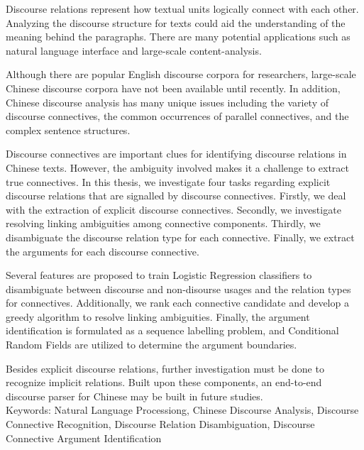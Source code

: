 \begin{abstracten}

Discourse relations represent how textual units logically connect
with each other. Analyzing the discourse structure for texts
could aid the understanding of the meaning behind the paragraphs.
There are many potential applications such as natural language
interface and large-scale content-analysis.

Although there are popular English discourse corpora for researchers,
large-scale Chinese discourse corpora have not been available until
recently. In addition, Chinese discourse analysis has many
unique issues including the variety of discourse connectives,
the common occurrences of parallel connectives, and the complex
sentence structures.

Discourse connectives are important clues for identifying discourse
relations in Chinese texts. However, the ambiguity involved makes
it a challenge to extract true connectives. In this thesis, we investigate
four tasks regarding explicit discourse relations that are signalled
by discourse connectives. Firstly, we deal with the extraction
of explicit discourse connectives. Secondly, we investigate resolving
linking ambiguities among connective components.
Thirdly, we disambiguate the discourse relation type for each connective.
Finally, we extract the arguments for each discourse connective.

Several features are proposed to train Logistic Regression classifiers
to disambiguate between discourse and non-disourse usages and
the relation types for connectives. Additionally, we rank each
connective candidate and develop a greedy algorithm to resolve
linking ambiguities. Finally, the argument identification is formulated
as a sequence labelling problem, and Conditional Random Fields are
utilized to determine the argument boundaries.

Besides explicit discourse relations, further investigation must be done
to recognize implicit relations. Built upon these components,
an end-to-end discourse parser for Chinese may be built in future studies. \\

\noindent
Keywords: Natural Language Processiong, Chinese Discourse Analysis,
Discourse Connective Recognition, Discourse Relation Disambiguation,
Discourse Connective Argument Identification
\end{abstracten}

